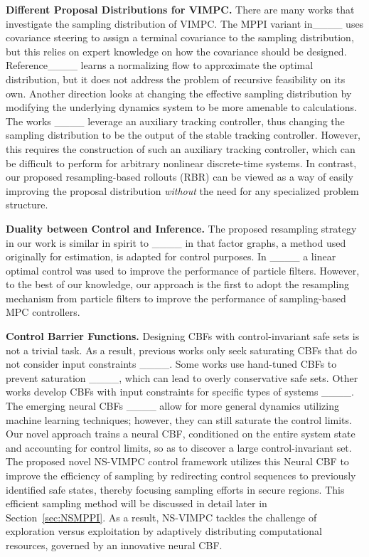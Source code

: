 \beforetextbf{}

\noindent\textbf{Different Proposal Distributions for VIMPC.}
There are many works that investigate the sampling distribution of VIMPC.
The MPPI variant in____ uses covariance steering to assign a terminal covariance to the sampling distribution, but this relies on expert knowledge on how the covariance should be designed.
Reference____ learns a normalizing flow to approximate the optimal distribution, but it does not address the problem of recursive feasibility on its own.
Another direction looks at changing the effective sampling distribution by modifying the underlying dynamics system to be more amenable to calculations.
The works ____ leverage an auxiliary tracking controller, thus changing the sampling distribution to be the output of the stable tracking controller. However, this requires the construction of such an auxiliary tracking controller, which can be difficult to perform for arbitrary nonlinear discrete-time systems.
In contrast, our proposed resampling-based rollouts (RBR) can be viewed as a way of easily improving the proposal distribution \textit{without} the need for any specialized problem structure.

\beforetextbf{}

\noindent\textbf{Duality between Control and Inference.}
The proposed resampling strategy in our work is similar in spirit to ____ in that
factor graphs, a method used originally for estimation, is adapted for control purposes.
In ____ a linear optimal control was used to improve the performance of particle filters.
However, to the best of our knowledge, our approach is the first to adopt the resampling mechanism from particle filters
to improve the performance of sampling-based MPC controllers.

\beforetextbf{}

\noindent\textbf{Control Barrier Functions.} 
Designing CBFs with control-invariant safe sets is not a trivial task. As a result, previous works only seek saturating CBFs that do not consider input constraints ____. Some works use hand-tuned CBFs to prevent saturation ____, which can lead to overly conservative safe sets. Other works develop CBFs with input constraints for specific types of systems ____. The emerging neural CBFs ____ allow for more general dynamics utilizing machine learning techniques; however, they can still saturate the control limits. 
Our novel approach trains a neural CBF, conditioned on the entire system state and accounting for control limits,  so as to discover a large control-invariant set. 
The proposed novel NS-VIMPC control framework utilizes this Neural CBF to improve the efficiency of sampling by redirecting control sequences to previously identified safe states, thereby focusing sampling efforts in secure regions. 
This efficient sampling method will be discussed in detail later in Section~\ref{sec:NSMPPI}. 
 As a result, NS-VIMPC tackles the challenge of exploration versus exploitation by adaptively distributing computational resources, governed by an innovative neural CBF.